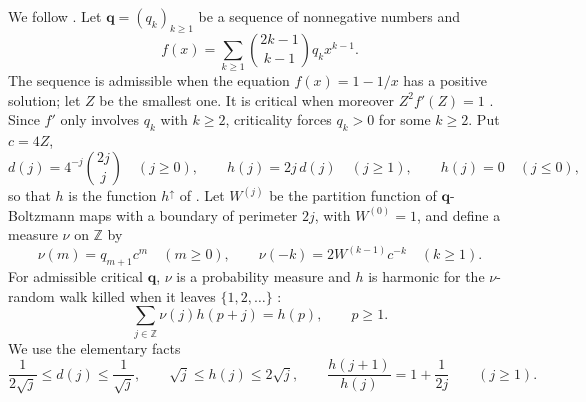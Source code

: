 \documentclass[11pt]{amsart}
\theoremstyle{remark}
\numberwithin{equation}{section}
\newcommand{\1}{\mathbf 1}
\begin{document}
We follow \cite{Cur}. Let $\mathbf q=(q_k)_{k\ge1}$ be a sequence of nonnegative numbers and
\[
f(x)=\sum_{k\ge1}\binom{2k-1}{k-1}q_kx^{k-1}.
\]
The sequence is admissible when the equation $f(x)=1-1/x$ has a positive solution; let $Z$ be the smallest one. It is critical when moreover $Z^2f'(Z)=1$ \cite[Proposition~5, Definition~9]{Cur}. Since $f'$ only involves $q_k$ with $k\ge2$, criticality forces $q_k>0$ for some $k\ge2$. Put $c=4Z$,
\[
d(j)=4^{-j}\binom{2j}j\quad(j\ge0),\qquad h(j)=2j\,d(j)\quad(j\ge1),\qquad h(j)=0\quad(j\le0),
\]
so that $h$ is the function $h^\uparrow$ of \cite{Cur}. Let $W^{(j)}$ be the partition function of $\mathbf q$-Boltzmann maps with a boundary of perimeter $2j$, with $W^{(0)}=1$, and define a measure $\nu$ on $\mathbb Z$ by
\[
\nu(m)=q_{m+1}c^m\quad(m\ge0),\qquad\nu(-k)=2W^{(k-1)}c^{-k}\quad(k\ge1).
\]
For admissible critical $\mathbf q$, $\nu$ is a probability measure and $h$ is harmonic for the $\nu$-random walk killed when it leaves $\{1,2,\dots\}$ \cite[Lemmas~9 and~11]{Cur}:
\begin{equation}\label{eq:harm}
\sum_{j\in\mathbb Z}\nu(j)h(p+j)=h(p),\qquad p\ge1 .
\end{equation}
We use the elementary facts
\begin{equation}\label{eq:dh}
\frac1{2\sqrt j}\le d(j)\le\frac1{\sqrt j},\qquad \sqrt j\le h(j)\le2\sqrt j,\qquad \frac{h(j+1)}{h(j)}=1+\frac1{2j}\qquad(j\ge1).
\end{equation}
\end{document}

